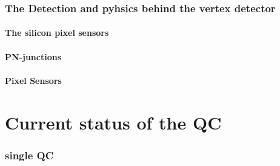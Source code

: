 \documentclass[a4paper, 12pt]{article}
\begin{document}
\section{The Detection and pyhsics behind the vertex detector}
\subsection{The silicon pixel sensors}
\subsection{PN-junctions}
\subsection{Pixel Sensors}

\part{Current status of the QC}
\section{single QC}







\clearpage

 
\end{document}

